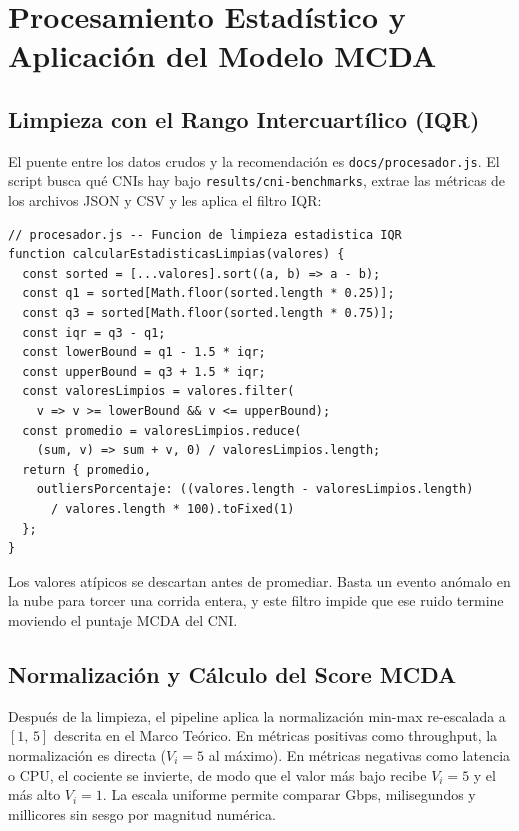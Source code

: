 \section{Procesamiento Estadístico y Aplicación del Modelo MCDA}

\subsection{Limpieza con el Rango Intercuartílico (IQR)}

El puente entre los datos crudos y la recomendación es \texttt{docs/procesador.js}. El script busca qué CNIs hay bajo \texttt{results/cni-benchmarks}, extrae las métricas de los archivos JSON y CSV y les aplica el filtro IQR:

\begin{lstlisting}
// procesador.js -- Funcion de limpieza estadistica IQR
function calcularEstadisticasLimpias(valores) {
  const sorted = [...valores].sort((a, b) => a - b);
  const q1 = sorted[Math.floor(sorted.length * 0.25)];
  const q3 = sorted[Math.floor(sorted.length * 0.75)];
  const iqr = q3 - q1;
  const lowerBound = q1 - 1.5 * iqr;
  const upperBound = q3 + 1.5 * iqr;
  const valoresLimpios = valores.filter(
    v => v >= lowerBound && v <= upperBound);
  const promedio = valoresLimpios.reduce(
    (sum, v) => sum + v, 0) / valoresLimpios.length;
  return { promedio,
    outliersPorcentaje: ((valores.length - valoresLimpios.length)
      / valores.length * 100).toFixed(1)
  };
}
\end{lstlisting}

Los valores atípicos se descartan antes de promediar. Basta un evento anómalo en la nube para torcer una corrida entera, y este filtro impide que ese ruido termine moviendo el puntaje MCDA del CNI.

\subsection{Normalización y Cálculo del Score MCDA}

Después de la limpieza, el pipeline aplica la normalización min-max re-escalada a $[1,\,5]$ descrita en el Marco Teórico. En métricas positivas como throughput, la normalización es directa ($V_i = 5$ al máximo). En métricas negativas como latencia o CPU, el cociente se invierte, de modo que el valor más bajo recibe $V_i = 5$ y el más alto $V_i = 1$. La escala uniforme permite comparar Gbps, milisegundos y millicores sin sesgo por magnitud numérica.

